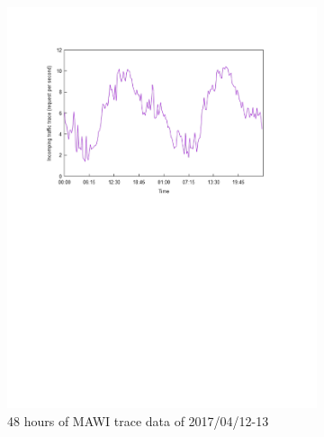 \documentclass[twocolumn]{article}
\begin{document}
\begin{figure}
		\centering
		\begin{subfigure}{\columnwidth}
			\centering
			\includegraphics[clip, trim=2.5cm 15cm 3.6cm 2.5cm, width=\columnwidth]{figures/pdf/traffic-1.pdf}
			\caption{48 hours of MAWI trace data of 2017/04/12-13}
		\end{subfigure}
		\begin{subfigure}{\columnwidth}
			\centering

\end{subfigure}
\end{figure}
\end{document}
